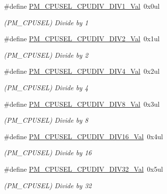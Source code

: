 \begin{DoxyCompactItemize}
\item 
\#define \mbox{\hyperlink{group___s_a_m_d21___p_m_ga1d79dfe939514654161cb9bfa85ba5b7}{P\+M\+\_\+\+C\+P\+U\+S\+E\+L\+\_\+\+C\+P\+U\+D\+I\+V\+\_\+\+D\+I\+V1\+\_\+\+Val}}~0x0ul
\begin{DoxyCompactList}\small\item\em (P\+M\+\_\+\+C\+P\+U\+S\+EL) Divide by 1 \end{DoxyCompactList}\item 
\#define \mbox{\hyperlink{group___s_a_m_d21___p_m_gac355a4c69da1a3a7c8f6620c72ce4786}{P\+M\+\_\+\+C\+P\+U\+S\+E\+L\+\_\+\+C\+P\+U\+D\+I\+V\+\_\+\+D\+I\+V2\+\_\+\+Val}}~0x1ul
\begin{DoxyCompactList}\small\item\em (P\+M\+\_\+\+C\+P\+U\+S\+EL) Divide by 2 \end{DoxyCompactList}\item 
\#define \mbox{\hyperlink{group___s_a_m_d21___p_m_gadd0d3f140d80559ad0c76d011e521d87}{P\+M\+\_\+\+C\+P\+U\+S\+E\+L\+\_\+\+C\+P\+U\+D\+I\+V\+\_\+\+D\+I\+V4\+\_\+\+Val}}~0x2ul
\begin{DoxyCompactList}\small\item\em (P\+M\+\_\+\+C\+P\+U\+S\+EL) Divide by 4 \end{DoxyCompactList}\item 
\#define \mbox{\hyperlink{group___s_a_m_d21___p_m_gac6f31caf1947754f99d6c969a88565e0}{P\+M\+\_\+\+C\+P\+U\+S\+E\+L\+\_\+\+C\+P\+U\+D\+I\+V\+\_\+\+D\+I\+V8\+\_\+\+Val}}~0x3ul
\begin{DoxyCompactList}\small\item\em (P\+M\+\_\+\+C\+P\+U\+S\+EL) Divide by 8 \end{DoxyCompactList}\item 
\#define \mbox{\hyperlink{group___s_a_m_d21___p_m_ga83eb5a5818cbb1e1db62be217ae6ee89}{P\+M\+\_\+\+C\+P\+U\+S\+E\+L\+\_\+\+C\+P\+U\+D\+I\+V\+\_\+\+D\+I\+V16\+\_\+\+Val}}~0x4ul
\begin{DoxyCompactList}\small\item\em (P\+M\+\_\+\+C\+P\+U\+S\+EL) Divide by 16 \end{DoxyCompactList}\item 
\#define \mbox{\hyperlink{group___s_a_m_d21___p_m_ga12dbe758dba92e2bec74eea6ad210df6}{P\+M\+\_\+\+C\+P\+U\+S\+E\+L\+\_\+\+C\+P\+U\+D\+I\+V\+\_\+\+D\+I\+V32\+\_\+\+Val}}~0x5ul
\begin{DoxyCompactList}\small\item\em (P\+M\+\_\+\+C\+P\+U\+S\+EL) Divide by 32 \end{DoxyCompactList}\item 

\end{DoxyCompactItemize}
